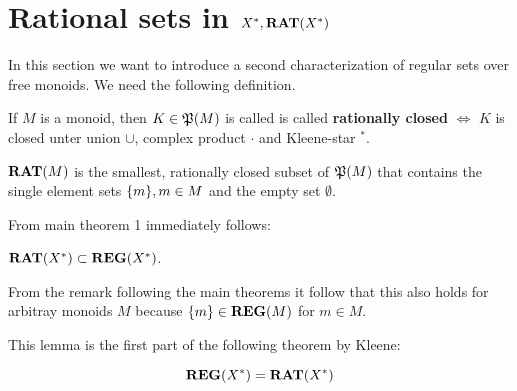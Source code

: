 \section{Rational sets in $X^*, \mbox{{\bf RAT}}(X^*)$}

In this section we want to introduce a second characterization of regular sets
over free monoids. We need the following definition.

\begin{definition}
If $M$ is a monoid, then $K \in \mathfrak{P}({M})$ is called is called {\bf rationally
closed} $\Leftrightarrow$ $K$ is closed unter union $\cup$, complex product $\cdot$ and Kleene-star $^*$.
\end{definition}

\begin{definition}
$\mbox{{\bf RAT}}(M)$ is the smallest, rationally closed subset of $\mathfrak{P}({M})$ that
contains the single element sets $\mbox{$\{m\}$}, m \in M$ and the empty set
$\emptyset$.
\end{definition}

From main theorem 1 immediately follows:

\begin{lemma}
$\mbox{{\bf RAT}}(X^*) \subset \mbox{{\bf REG}}(X^*)$.
\end{lemma}

From the remark following the main theorems it follow that this also holds for
arbitray monoids $M$ because $\mbox{$\{m\}$} \in \mbox{{\bf REG}}(M)$ for $m \in M$.

This lemma is the first part of the following theorem by Kleene:

\begin{theorem}[Kleene]
\[ \mbox{{\bf REG}}(X^*) = \mbox{{\bf RAT}}(X^*) \]
\end{theorem}

